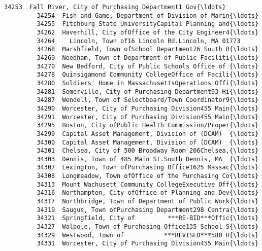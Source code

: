 \documentclass[11pt]{article}
\begin{document}
\begin{Verbatim}[commandchars=\\\{\}]
         34253  Fall River, City of Purchasing Department1 Gov{\ldots}   
         34254  Fish and Game, Department of Division of Marin{\ldots}   
         34255  Fitchburg State UniversityCapital Planning and{\ldots}   
         34262  Haverhill, City ofOffice of the City Engineer4{\ldots}   
         34264    Lincoln, Town of16 Lincoln Rd.Lincoln, MA 01773   
         34268  Marshfield, Town ofSchool Department76 South R{\ldots}   
         34269  Needham, Town of Department of Public Faciliti{\ldots}   
         34270  New Bedford, City of Public Schools Office of {\ldots}   
         34278  Quinsigamond Community CollegeOffice of Facili{\ldots}   
         34280  Soldiers' Home in MassachusettsOperations Offi{\ldots}   
         34281  Somerville, City of Purchasing Department93 Hi{\ldots}   
         34287  Wendell, Town of Selectboard/Town Coordinator9{\ldots}   
         34290  Worcester, City of Purchasing Division455 Main{\ldots}   
         34291  Worcester, City of Purchasing Division455 Main{\ldots}   
         34295  Boston, City ofPublic Health Commission/Proper{\ldots}   
         34299  Capital Asset Management, Division of (DCAM)  {\ldots}   
         34300  Capital Asset Management, Division of (DCAM)  {\ldots}   
         34301  Chelsea, City of 500 Broadway Room 206Chelsea,{\ldots}   
         34303  Dennis, Town of 485 Main St.South Dennis, MA  {\ldots}   
         34307  Lexington, Town ofPurchasing Office1625 Massac{\ldots}   
         34308  Longmeadow, Town ofOffice of the Purchasing Co{\ldots}   
         34313  Mount Wachusett Community CollegeExecutive Off{\ldots}   
         34316  Northampton, City ofOffice of Planning and Dev{\ldots}   
         34317  Northbridge, Town of Department of Public Work{\ldots}   
         34319  Saugus, Town ofPurchasing Department298 Centra{\ldots}   
         34321  Springfield, City of         ***RE-BID***Offic{\ldots}   
         34327  Walpole, Town of Purchasing Office135 School S{\ldots}   
         34329  Westwood, Town of           ***REVISED***580 H{\ldots}   
         34331  Worcester, City of Purchasing Division455 Main{\ldots}   
         

\end{Verbatim}
\end{document}

